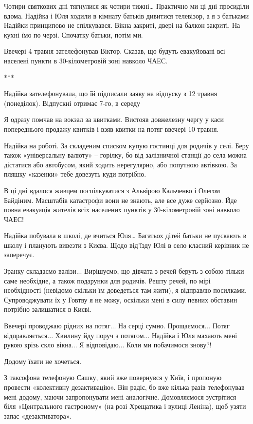 Чотири святкових дні тягнулися як чотири тижні… Практично ми ці дні просиділи
вдома. Надійка і Юля ходили в кімнату батьків дивитися телевізор, а я з
батьками Надійки принципово не спілкувався. Вікна закриті, двері на балкон
закриті. На кухні їмо по черзі. Спочатку батьки, потім ми.

Ввечері 4 травня зателефонував Віктор. Сказав, що будуть евакуйовані всі
населені пункти в 30-кілометровій зоні навколо ЧАЕС.

***


Надійка зателефонувала, що їй підписали заяву на відпуску з 12 травня
(понеділок). Відпускні отримає 7-го, в середу

Я одразу помчав на вокзал за квитками. Вистояв довжелезну чергу у каси
попереднього продажу квитків і взяв квитки на потяг ввечері 10 травня. 


Надійка на роботі. За складеним списком купую гостинці для родичів у селі. Беру
також «універсальну валюту» – горілку, бо від залізничної станції до села можна
дістатися або автобусом, який ходить нерегулярно, або попутною автівкою. За
пляшку «казенки» тебе довезуть куди потрібно. 

В ці дні вдалося живцем поспілкуватися з Альвірою Кальченко і Олегом Байдіним.
Масштабів катастрофи вони не знають, але все дуже серйозно. Йде повна евакуація
жителів всіх населених пунктів у 30-кілометровій зоні навколо ЧАЕС!

Надійка побувала в школі, де вчиться Юля… Багатьох дітей батьки не пускають в
школу і планують вивезти з Києва. Щодо від’їзду Юлі в село класний керівник не
заперечує.


Зранку складаємо валізи... Вирішуємо, що дівчата з речей беруть з собою тільки
саме необхідне, а також подарунки для родичів. Решту речей, по мірі
необхідності (невідомо скільки їм доведеться там жити), я відправлю посилками.
Супроводжувати їх у Говтву я не можу, оскільки мені в силу певних обставин
потрібно залишатися в Києві.

Ввечері проводжаю рідних на потяг... На серці сумно. Прощаємося... Потяг
відправляється... Хвилину йду поруч з потягом... Надійка і Юля махають мені рукою
крізь скло вікна... Я відповідаю... Коли ми побачимося знову?!

Додому їхати не хочеться.

З таксофона телефоную Сашку, який вже повернувся у Київ, і пропоную провести
«колективну дезактивацію». Він радіє, бо вже кілька разів телефонував мені
додому, маючи запропонувати мені аналогічне. Домовляємося зустрітися біля
«Центрального гастроному» (на розі Хрещатика і вулиці Леніна), щоб узяти запас
«дезактиватора».

